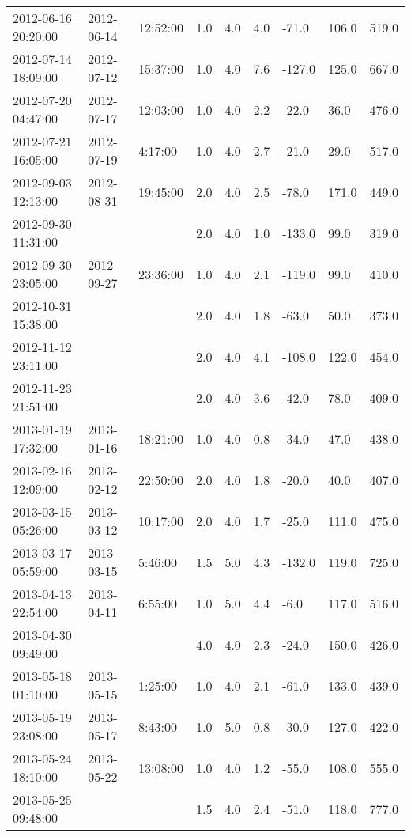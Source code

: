 \begin{longtable}{lllllllll}
        2012-06-16 20:20:00 & 2012-06-14 & 12:52:00 & 1.0 & 4.0 & 4.0 & -71.0 & 106.0 & 519.0 \\ 
        2012-07-14 18:09:00 & 2012-07-12 & 15:37:00 & 1.0 & 4.0 & 7.6 & -127.0 & 125.0 & 667.0 \\ 
        2012-07-20 04:47:00 & 2012-07-17 & 12:03:00 & 1.0 & 4.0 & 2.2 & -22.0 & 36.0 & 476.0 \\ 
        2012-07-21 16:05:00 & 2012-07-19 & 4:17:00 & 1.0 & 4.0 & 2.7 & -21.0 & 29.0 & 517.0 \\ 
        2012-09-03 12:13:00 & 2012-08-31 & 19:45:00 & 2.0 & 4.0 & 2.5 & -78.0 & 171.0 & 449.0 \\ 
        2012-09-30 11:31:00 & ~ & ~ & 2.0 & 4.0 & 1.0 & -133.0 & 99.0 & 319.0 \\ 
        2012-09-30 23:05:00 & 2012-09-27 & 23:36:00 & 1.0 & 4.0 & 2.1 & -119.0 & 99.0 & 410.0 \\ 
        2012-10-31 15:38:00 & ~ & ~ & 2.0 & 4.0 & 1.8 & -63.0 & 50.0 & 373.0 \\ 
        2012-11-12 23:11:00 & ~ & ~ & 2.0 & 4.0 & 4.1 & -108.0 & 122.0 & 454.0 \\ 
        2012-11-23 21:51:00 & ~ & ~ & 2.0 & 4.0 & 3.6 & -42.0 & 78.0 & 409.0 \\ 
        2013-01-19 17:32:00 & 2013-01-16 & 18:21:00 & 1.0 & 4.0 & 0.8 & -34.0 & 47.0 & 438.0 \\ 
        2013-02-16 12:09:00 & 2013-02-12 & 22:50:00 & 2.0 & 4.0 & 1.8 & -20.0 & 40.0 & 407.0 \\ 
        2013-03-15 05:26:00 & 2013-03-12 & 10:17:00 & 2.0 & 4.0 & 1.7 & -25.0 & 111.0 & 475.0 \\ 
        2013-03-17 05:59:00 & 2013-03-15 & 5:46:00 & 1.5 & 5.0 & 4.3 & -132.0 & 119.0 & 725.0 \\ 
        2013-04-13 22:54:00 & 2013-04-11 & 6:55:00 & 1.0 & 5.0 & 4.4 & -6.0 & 117.0 & 516.0 \\ 
        2013-04-30 09:49:00 & ~ & ~ & 4.0 & 4.0 & 2.3 & -24.0 & 150.0 & 426.0 \\ 
        2013-05-18 01:10:00 & 2013-05-15 & 1:25:00 & 1.0 & 4.0 & 2.1 & -61.0 & 133.0 & 439.0 \\ 
        2013-05-19 23:08:00 & 2013-05-17 & 8:43:00 & 1.0 & 5.0 & 0.8 & -30.0 & 127.0 & 422.0 \\ 
        2013-05-24 18:10:00 & 2013-05-22 & 13:08:00 & 1.0 & 4.0 & 1.2 & -55.0 & 108.0 & 555.0 \\ 
        2013-05-25 09:48:00 & ~ & ~ & 1.5 & 4.0 & 2.4 & -51.0 & 118.0 & 777.0 \\ 

\end{longtable}
